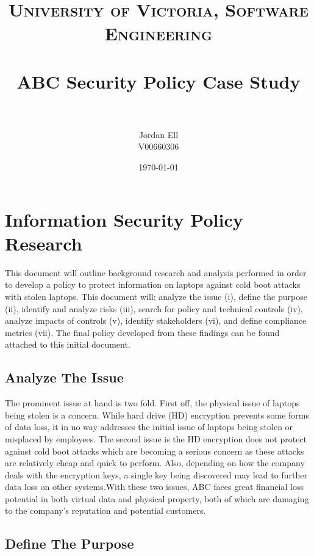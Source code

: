 \documentclass[paper=a4, fontsize=11pt]{scrartcl} %
\title{	
\normalfont \normalsize 
\textsc{University of Victoria, Software Engineering} \\ [25pt] %
\horrule{0.5pt} \\[0.4cm] %
\huge ABC Security Policy Case Study \\ %
\horrule{2pt} \\[0.5cm] %
}
\author{Jordan Ell\\
V00660306} %
\date{\normalsize\today} %
\numberwithin{equation}{section} %
\numberwithin{figure}{section} %
\numberwithin{table}{section} %
\begin{document}
\maketitle %


\section{Information Security Policy Research}

This document will outline background research and analysis performed in order
to develop a policy to protect information on laptops against cold boot attacks
with stolen laptops. This document will: analyze the issue (i), define the 
purpose (ii), identify and analyze risks (iii), search for policy and technical
controls (iv), analyze impacts of controls (v), identify stakeholders (vi), 
and define compliance metrics (vii). The final policy developed from these
findings can be found attached to this initial document.


\subsection{Analyze The Issue}

The prominent issue at hand is two fold. First off, the physical issue of
laptops being stolen is a concern. While hard drive (HD) encryption prevents
some forms of data loss, it in no way addresses the initial issue of laptops
being stolen or misplaced by employees. The second issue is the HD encryption
does not protect against cold boot attacks which are becoming a serious concern
as these attacks are relatively cheap and quick to perform. Also, depending on 
how the company deals with the encryption keys, a single key being discovered may 
lead to further data loss on other systems.With these two
issues, ABC faces great financial loss potential in both virtual data and
physical property, both of which are damaging to the company's reputation and
potential customers.


\subsection{Define The Purpose}
\end{document}
